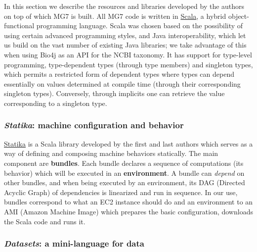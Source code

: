 \documentclass[fleqn,10pt,lineno]{wlpeerj}
\begin{document}
In this section we describe the resources and libraries developed by the
authors on top of which MG7 is built. All MG7 code is written in
\protect\hyperlink{scala}{Scala}, a hybrid object-functional programming
language. Scala was chosen based on the possibility of using certain
advanced programming styles, and Java interoperability, which let us
build on the vast number of existing Java libraries; we take advantage
of this when using Bio4j as an API for the NCBI taxonomy. It has support
for type-level programming, type-dependent types (through type members)
and singleton types, which permits a restricted form of dependent types
where types can depend essentially on values determined at compile time
(through their corresponding singleton types). Conversely, through
implicits one can retrieve the value corresponding to a singleton type.

\subsubsection{\texorpdfstring{\emph{Statika}: machine configuration and
behavior}{Statika: machine configuration and behavior}}\label{statika-machine-configuration-and-behavior}

\protect\hyperlink{statika}{Statika} is a Scala library developed by the
first and last authors which serves as a way of defining and composing
machine behaviors statically. The main component are \textbf{bundles}.
Each bundle declares a sequence of computations (its behavior) which
will be executed in an \textbf{environment}. A bundle can \emph{depend}
on other bundles, and when being executed by an environment, its DAG
(Directed Acyclic Graph) of dependencies is linearized and run in
sequence. In our use, bundles correspond to what an EC2 instance should
do and an environment to an AMI (Amazon Machine Image) which prepares
the basic configuration, downloads the Scala code and runs it.

\subsubsection{\texorpdfstring{\emph{Datasets}: a mini-language for
data}{Datasets: a mini-language for data}}\label{datasets-a-mini-language-for-data}
\end{document}
